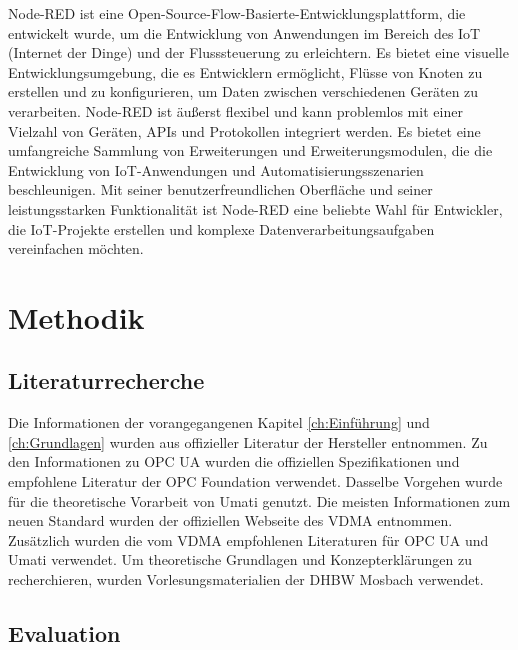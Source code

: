 \documentclass[a4paper, 12pt, oneside, toc=listofnumbered, bibliography=totoc]{scrbook}
\begin{document}
		Node-RED ist eine Open-Source-Flow-Basierte-Entwicklungsplattform, die entwickelt wurde, um die Entwicklung von Anwendungen im Bereich des IoT (Internet der Dinge) und der Flusssteuerung zu erleichtern. Es bietet eine visuelle Entwicklungsumgebung, die es Entwicklern ermöglicht, Flüsse von Knoten zu erstellen und zu konfigurieren, um Daten zwischen verschiedenen Geräten zu verarbeiten. Node-RED ist äußerst flexibel und kann problemlos mit einer Vielzahl von Geräten, APIs und Protokollen integriert werden. Es bietet eine umfangreiche Sammlung von Erweiterungen und Erweiterungsmodulen, die die Entwicklung von IoT-Anwendungen und Automatisierungsszenarien beschleunigen. Mit seiner benutzerfreundlichen Oberfläche und seiner leistungsstarken Funktionalität ist Node-RED eine beliebte Wahl für Entwickler, die IoT-Projekte erstellen und komplexe Datenverarbeitungsaufgaben vereinfachen möchten. \cite{noauthor_about_nodate-1}
		
\chapter{Methodik}\label{ch:Methodiken}
	
	
	\section{Literaturrecherche}
	
	Die Informationen der vorangegangenen Kapitel \ref{ch:Einführung} und \ref{ch:Grundlagen} wurden aus offizieller Literatur der Hersteller entnommen. Zu den Informationen zu OPC UA wurden die offiziellen Spezifikationen und empfohlene Literatur der OPC Foundation verwendet. Dasselbe Vorgehen wurde für die theoretische Vorarbeit von \ac{Umati} genutzt. Die meisten Informationen zum neuen Standard wurden der offiziellen Webseite des VDMA entnommen. Zusätzlich wurden die vom VDMA empfohlenen Literaturen für OPC UA und Umati verwendet. Um theoretische Grundlagen und Konzepterklärungen zu recherchieren, wurden Vorlesungsmaterialien der DHBW Mosbach verwendet.
	
	
	
	\section{Evaluation}
	
\end{document}
